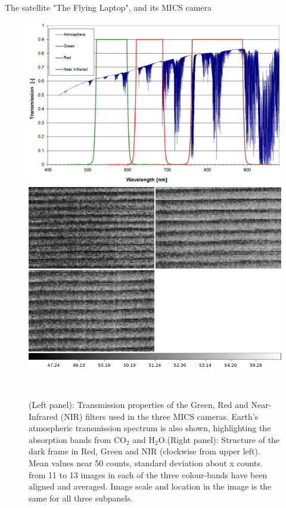 \documentclass[final,hyperref={pdfpagelabels=false}]{beamer}
\begin{document}
\begin{frame}[t]
\begin{columns}[t]
\begin{column}{.23\textwidth}
\begin{block}{The satellite "The Flying Laptop", and its MICS camera}
\begin{figure}
    \centering
    \includegraphics[scale=0.41]{fig/mics_filter_characteristics.png}
    \includegraphics[scale=0.41]{fig/ripplefig.png}
    \caption{(Left panel): Transmission properties of the Green, Red and Near-Infrared (NIR) filters used in the three MICS cameras. Earth's atmospheric transmission spectrum is also shown, highlighting the absorption bands from CO$_2$ and H$_2$O.(Right panel): Structure of the dark frame in Red, Green and NIR (clockwise from upper left). Mean values near 50 counts, standard deviation about x counts. from 11 to 13 images in each of the three colour-bands have been aligned and averaged. Image scale and location in the image is the same for all three subpanels. }
    ~\label{fig:filterfig}
\end{figure}

\end{block}





\end{column}
\end{columns}
\end{frame}
\end{document}

